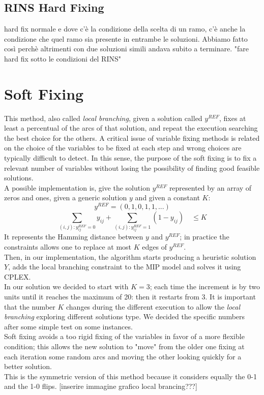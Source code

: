 \subsection{RINS Hard Fixing}
hard fix normale e dove c'è la condizione della scelta di un ramo, c'è anche la condizione che quel ramo sia presente in entrambe le soluzioni. Abbiamo fatto così perchè altrimenti con due soluzioni simili andava subito a terminare. 
"fare hard fix sotto le condizioni del RINS" 


\section{Soft Fixing}
This method, also called \textit{local branching}, given a solution called $y^{REF}$, fixes at least a percentual of the arcs of that solution, and repeat the execution searching the best choice for the others. A critical issue of variable fixing methods is related on the choice of the variables to be fixed at each step and wrong choices are typically difficult to detect. In this sense, the purpose of the soft fixing is to fix a relevant number of variables without losing the possibility of finding good feasible solutions.\\
A possible implementation is, give the solution $y^{REF}$ represented by an array of zeros and ones, given a generic solution $y$ and given a constant $K$:
\[
	y^{REF} = (0,1,0,1,1,...)
\]
\[
	\sum_{(i,j):y^{REF}_{ij}=0} y_{ij} + \sum_{(i,j):y^{REF}_{ij}=1} (1-y_{ij}) \quad \leq K
\]
It represents the Hamming distance between $y$ and $y^{REF}$; in practice the constraints allows one to replace at most $K$ edges of $y^{REF}$. \\
Then, in our implementation, the algorithm starts producing a heuristic solution $Y$, adds the local branching constraint to the MIP model and solves it using \textsc{CPLEX}.\\
In our solution we decided to start with $K=3$; each time the increment is by two units until it reaches the maximum of 20: then it restarts from 3. It is important that the number $K$ changes during the different execution to allow the \textit{local branching} exploring different solutions type. We decided the specific numbers after some simple test on some instances.\\
Soft fixing avoids a too rigid fixing of the variables in favor of a more flexible condition; this allows the new solution to "move" from the older one fixing at each iteration some random arcs and moving the other looking quickly for a better solution.\\
This is the symmetric version of this method because it considers equally the 0-1 and the 1-0 flips. 
[inserire immagine grafico local brancing???]
